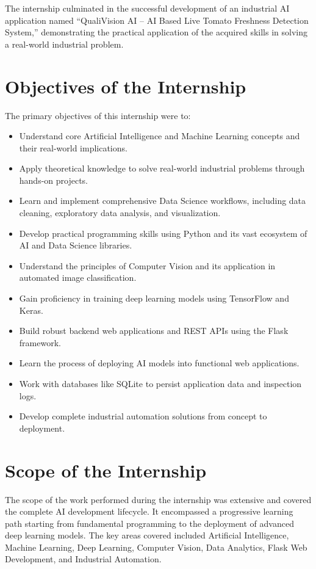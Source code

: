The internship culminated in the successful development of an industrial AI application named ``QualiVision AI – AI Based Live Tomato Freshness Detection System,'' demonstrating the practical application of the acquired skills in solving a real-world industrial problem.

\section{Objectives of the Internship}

The primary objectives of this internship were to:
\begin{itemize}[leftmargin=1.5cm]
    \item Understand core Artificial Intelligence and Machine Learning concepts and their real-world implications.
    \item Apply theoretical knowledge to solve real-world industrial problems through hands-on projects.
    \item Learn and implement comprehensive Data Science workflows, including data cleaning, exploratory data analysis, and visualization.
    \item Develop practical programming skills using Python and its vast ecosystem of AI and Data Science libraries.
    \item Understand the principles of Computer Vision and its application in automated image classification.
    \item Gain proficiency in training deep learning models using TensorFlow and Keras.
    \item Build robust backend web applications and REST APIs using the Flask framework.
    \item Learn the process of deploying AI models into functional web applications.
    \item Work with databases like SQLite to persist application data and inspection logs.
    \item Develop complete industrial automation solutions from concept to deployment.
\end{itemize}

\section{Scope of the Internship}

The scope of the work performed during the internship was extensive and covered the complete AI development lifecycle. It encompassed a progressive learning path starting from fundamental programming to the deployment of advanced deep learning models. The key areas covered included Artificial Intelligence, Machine Learning, Deep Learning, Computer Vision, Data Analytics, Flask Web Development, and Industrial Automation. 

